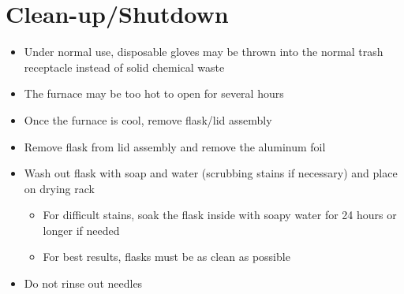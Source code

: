 \documentclass[letterpaper,11pt]{article}
\begin{document}
\section{Clean-up/Shutdown}

    \begin{itemize}
    \item Under normal use, disposable gloves may be thrown into the normal 
        trash receptacle instead of solid chemical waste
    \item The furnace may be too hot to open for several hours
    \item Once the furnace is cool, remove flask/lid assembly
    \item Remove flask from lid assembly and remove the aluminum foil
    \item Wash out flask with soap and water (scrubbing stains if necessary) and 
        place on drying rack
        \begin{itemize}
        \item For difficult stains, soak the flask inside with soapy water for 
            24 hours or longer if needed
        \item For best results, flasks must be as clean as possible
        \end{itemize}
    \item Do not rinse out needles
    \end{itemize}
\end{document}
